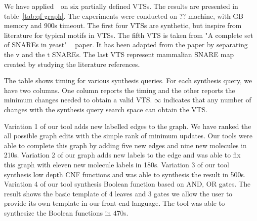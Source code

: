 We have applied~\ourtool~on six partially defined VTSs.
%
The results are presented in table~\ref{tab:qf-graph}.
%
The experiments were conducted on ?? machine,
with GB memory and 900s timeout.
%
The first four VTSs are synthetic, but inspire from literature for
typical motifs in VTSs. 
%
%
The fifth VTS is taken from "A complete set of SNAREs in yeast"
~\cite{burri2004complete} paper. It has been adapted from the paper by
separating the v and the t SNAREs. 
%
The last VTS represent mammalian SNARE map created by studying the literature references.  

The table shows timing for various synthesis queries.
%
For each synthesis query, we have two columns.
%
One column reports the timing and the other reports the minimum changes
needed to obtain a valid VTS.
%
$\infty$ indicates that any number of changes with the synthesis query
search space can obtain the VTS.
%

Variation 1 of our tool adds new labelled edges to the graph.
%
We have ranked the all possible graph edits with the simple rank of
minimum updates.
%
Our tools were able to complete this graph by adding five new edges
and nine new molecules in 210s.
%
Variation 2 of our graph adds new labels to the edge and was able to
fix this graph with eleven new molecule labels in 180s.
%
Variation 3 of our tool synthesis low depth CNF functions and was able
to synthesis the result in 500s.
%
Variation 4 of our tool synthesis Boolean function based on AND, OR
gates.
%
The result shows the basic template of 4 leaves and 3 gates we allow
the user to provide its own template in our front-end language.
%
The tool was able to synthesize the Boolean functions in 470s.
%
%
%


